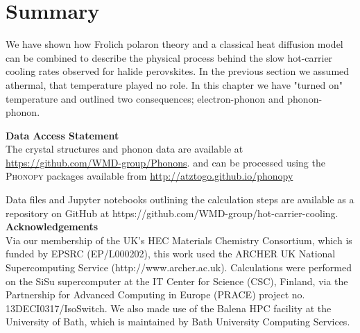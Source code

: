 \section{Summary}

We have shown how Fr{\:o}lich polaron theory and a classical heat diffusion model can be combined to
describe the physical process behind the slow hot-carrier cooling rates
observed for halide perovskites.
In the previous section we assumed athermal, that temperature played no role. In this chapter we have "turned on" temperature and outlined two consequences; electron-phonon and phonon-phonon.

\textbf{Data Access Statement}\\
The crystal structures and phonon data are available at \url{https://github.com/WMD-group/Phonons}. 
and can be processed using the \textsc{Phonopy} packages available from \url{http://atztogo.github.io/phonopy} 

Data files and Jupyter notebooks outlining the calculation steps are available as a repository on GitHub at https://github.com/WMD-group/hot-carrier-cooling.
\textbf{Acknowledgements}\\
Via our membership of the UK's HEC Materials Chemistry Consortium, which is funded by EPSRC (EP/L000202), this work used the ARCHER UK National Supercomputing Service (http://www.archer.ac.uk).
Calculations were performed on the SiSu supercomputer at the IT Center for Science (CSC), Finland, via the Partnership for Advanced Computing in Europe (PRACE) project no. 13DECI0317/IsoSwitch. We also made use of the Balena HPC facility at the University of Bath, which is maintained by Bath University Computing Services.


